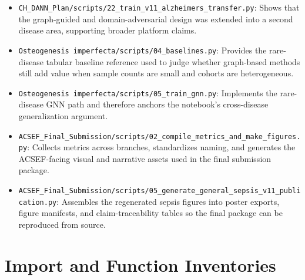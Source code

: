 \documentclass[11pt]{article}
\begin{document}
\begin{itemize}
\item \texttt{CH\_DANN\_Plan/scripts/22\_train\_v11\_alzheimers\_transfer.py}: Shows that the graph-guided and domain-adversarial design was extended into a second disease area, supporting broader platform claims.
\item \texttt{Osteogenesis imperfecta/scripts/04\_baselines.py}: Provides the rare-disease tabular baseline reference used to judge whether graph-based methods still add value when sample counts are small and cohorts are heterogeneous.
\item \texttt{Osteogenesis imperfecta/scripts/05\_train\_gnn.py}: Implements the rare-disease GNN path and therefore anchors the notebook's cross-disease generalization argument.
\item \texttt{ACSEF\_Final\_Submission/scripts/02\_compile\_metrics\_and\_make\_figures.py}: Collects metrics across branches, standardizes naming, and generates the ACSEF-facing visual and narrative assets used in the final submission package.
\item \texttt{ACSEF\_Final\_Submission/scripts/05\_generate\_general\_sepsis\_v11\_publication.py}: Assembles the regenerated sepsis figures into poster exports, figure manifests, and claim-traceability tables so the final package can be reproduced from source.
\end{itemize}
\section{Import and Function Inventories}
\end{document}
